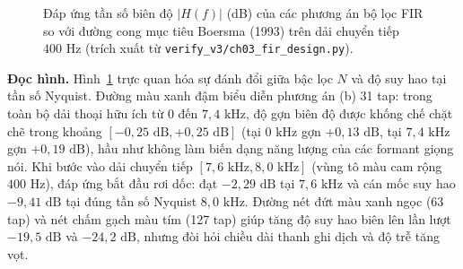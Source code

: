 \begin{figure}[htbp]
\centering

\caption{Đáp ứng tần số biên độ $|H(f)|$ (dB) của các phương án bộ lọc FIR so với đường cong mục tiêu Boersma (1993) trên dải chuyển tiếp $400\text{ Hz}$ (trích xuất từ \texttt{verify\_v3/ch03\_fir\_design.py}).}
\label{fig:ch03_freq_response}
\end{figure}

\textbf{Đọc hình.} Hình~\ref{fig:ch03_freq_response} trực quan hóa sự đánh đổi giữa bậc lọc $N$ và độ suy hao tại tần số Nyquist. Đường màu xanh đậm biểu diễn phương án (b) 31 tap: trong toàn bộ dải thoại hữu ích từ $0$ đến $7{,}4\text{ kHz}$, độ gợn biên độ được khống chế chặt chẽ trong khoảng $[-0{,}25\text{ dB}, +0{,}25\text{ dB}]$ (tại $0\text{ kHz}$ gợn $+0{,}13\text{ dB}$, tại $7{,}4\text{ kHz}$ gợn $+0{,}19\text{ dB}$), hầu như không làm biến dạng năng lượng của các formant giọng nói. Khi bước vào dải chuyển tiếp $[7{,}6\text{ kHz}, 8{,}0\text{ kHz}]$ (vùng tô màu cam rộng $400\text{ Hz}$), đáp ứng bắt đầu rơi dốc: đạt $-2{,}29\text{ dB}$ tại $7{,}6\text{ kHz}$ và cán mốc suy hao $-9{,}41\text{ dB}$ tại đúng tần số Nyquist $8{,}0\text{ kHz}$. Đường nét đứt màu xanh ngọc (63 tap) và nét chấm gạch màu tím (127 tap) giúp tăng độ suy hao biên lên lần lượt $-19{,}5\text{ dB}$ và $-24{,}2\text{ dB}$, nhưng đòi hỏi chiều dài thanh ghi dịch và độ trễ tăng vọt.

